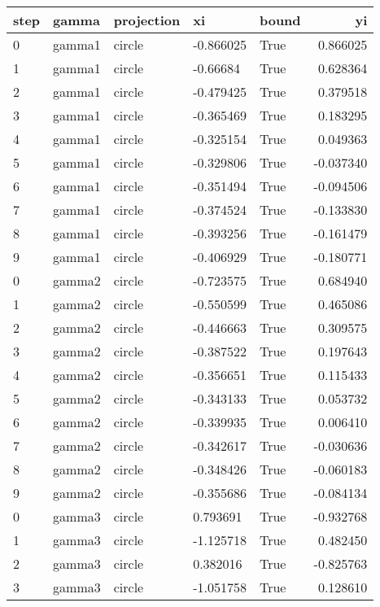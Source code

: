 \begin{tabular}{lllllr}
\toprule
step &  gamma & projection &        xi & bound &        yi \\
\midrule
   0 & gamma1 &     circle & -0.866025 &  True &  0.866025 \\
   1 & gamma1 &     circle &  -0.66684 &  True &  0.628364 \\
   2 & gamma1 &     circle & -0.479425 &  True &  0.379518 \\
   3 & gamma1 &     circle & -0.365469 &  True &  0.183295 \\
   4 & gamma1 &     circle & -0.325154 &  True &  0.049363 \\
   5 & gamma1 &     circle & -0.329806 &  True & -0.037340 \\
   6 & gamma1 &     circle & -0.351494 &  True & -0.094506 \\
   7 & gamma1 &     circle & -0.374524 &  True & -0.133830 \\
   8 & gamma1 &     circle & -0.393256 &  True & -0.161479 \\
   9 & gamma1 &     circle & -0.406929 &  True & -0.180771 \\
   0 & gamma2 &     circle & -0.723575 &  True &  0.684940 \\
   1 & gamma2 &     circle & -0.550599 &  True &  0.465086 \\
   2 & gamma2 &     circle & -0.446663 &  True &  0.309575 \\
   3 & gamma2 &     circle & -0.387522 &  True &  0.197643 \\
   4 & gamma2 &     circle & -0.356651 &  True &  0.115433 \\
   5 & gamma2 &     circle & -0.343133 &  True &  0.053732 \\
   6 & gamma2 &     circle & -0.339935 &  True &  0.006410 \\
   7 & gamma2 &     circle & -0.342617 &  True & -0.030636 \\
   8 & gamma2 &     circle & -0.348426 &  True & -0.060183 \\
   9 & gamma2 &     circle & -0.355686 &  True & -0.084134 \\
   0 & gamma3 &     circle &  0.793691 &  True & -0.932768 \\
   1 & gamma3 &     circle & -1.125718 &  True &  0.482450 \\
   2 & gamma3 &     circle &  0.382016 &  True & -0.825763 \\
   3 & gamma3 &     circle & -1.051758 &  True &  0.128610 \\

\end{tabular}
